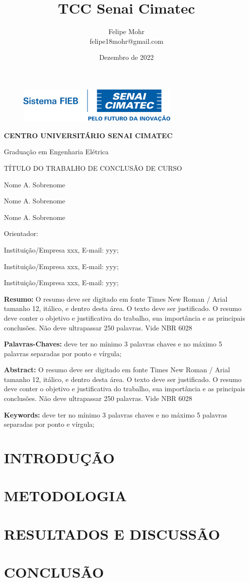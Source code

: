 \documentclass[a4paper, 12pt]{article}
\title{TCC Senai Cimatec}
\author{Felipe Mohr \\ felipe18mohr@gmail.com}
\date{Dezembro de 2022}
\renewcommand\maketitle{
    \begin{figure}[t]
        \centering
        \includegraphics[width=8cm]{logo_cimatec.png}
    \end{figure}

    \begin{center}
        \textbf{CENTRO UNIVERSITÁRIO SENAI CIMATEC}

        Graduação em Engenharia Elétrica

        \vspace{0.5cm}
        
        TÍTULO DO TRABALHO DE CONCLUSÃO DE CURSO
    \end{center}

    \begin{flushright}
        Nome A. Sobrenome

        Nome A. Sobrenome
        
        Nome A. Sobrenome
        
        Orientador: 
    \end{flushright}

    \begin{flushleft}
        Instituição/Empresa xxx, E-mail: yyy;
        
        Instituição/Empresa xxx, E-mail: yyy;

        Instituição/Empresa xxx, E-mail: yyy;
    \end{flushleft}

    \vspace{0.5cm}

    \noindent\textbf{Resumo:} O resumo deve ser digitado em fonte Times New Roman / Arial tamanho 12,  itálico, e dentro desta área. O texto deve ser justificado. O resumo deve conter o objetivo  e  justificativa  do  trabalho,  sua  importância  e  as  principais  conclusões.  Não  deve  ultrapassar 250 palavras. Vide NBR 6028

    \noindent\textbf{Palavras-Chaves:} deve  ter  no  mínimo  3  palavras  chaves  e  no  máximo  5  palavras  separadas por ponto e vírgula;

    \vspace{1.0cm}
    
    \noindent\textbf{Abstract:} O resumo deve ser digitado em fonte Times New Roman / Arial tamanho 12,  itálico, e dentro desta área. O texto deve ser justificado. O resumo deve conter o objetivo  e  justificativa  do  trabalho,  sua  importância  e  as  principais  conclusões.  Não  deve  ultrapassar 250 palavras. Vide NBR 6028

    \noindent\textbf{Keywords:} deve  ter  no  mínimo  3  palavras  chaves  e  no  máximo  5  palavras  separadas por ponto e vírgula;

}
\begin{document}
    \maketitle
    \newpage


    \section{INTRODUÇÃO}
    

    \section{METODOLOGIA} 
    

    \section{RESULTADOS E DISCUSSÃO}
    

    \section{CONCLUSÃO}
    

    
    
    
\end{document}
